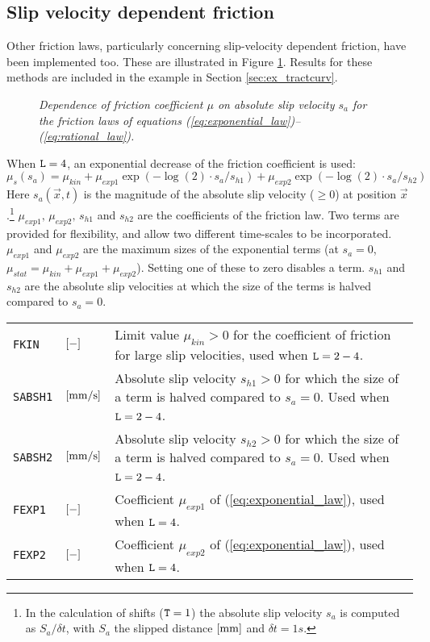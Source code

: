 \documentclass[12pt]{report}
\newcommand{\allexamp}[1]{}
\newenvironment{inputvars}{\vspace{0.4\baselineskip}%

\begin{tabular}{>{\raggedright}p{22mm}p{19mm}p{113mm}}}{
\end{tabular}

}
\newcommand{\inpvar}[3]{{\small\tt #1} & $#2$ & #3 \\[1ex]}
\begin{document}
\subsection{Slip velocity dependent friction}
\label{sec:veldep_fric}

Other friction laws, particularly concerning slip-velocity dependent
friction, have been implemented too. These are illustrated in Figure
\ref{fig:fric_laws}. Results for these methods are included in the
example in Section \ref{sec:ex_tractcurv}\allexamp{, whereas a detailed
investigation is shown in Section \ref{sec:ex_veldep}}.

\begin{figure}[bt]
\centering
{}
\caption{\em Dependence of friction coefficient $\mu$ on absolute slip
velocity $s_a$ for the friction laws of equations
(\ref{eq:exponential_law})--(\ref{eq:rational_law}).}
\label{fig:fric_laws}
\end{figure}

When ${\tt L}=4$, an exponential decrease of the friction coefficient
is used:
\begin{equation}\label{eq:exponential_law}
   \mu_s(s_a) = \mu_{kin} +
        \mu_{exp1} \exp(-\log(2)\cdot s_a/s_{h1}) +
        \mu_{exp2} \exp(-\log(2)\cdot s_a/s_{h2})
\end{equation}
Here $s_a(\vec{x},t)$ is the magnitude of the absolute slip velocity ($\ge 0$)
at position $\vec{x}$.\footnote{\label{foot:s_a}In the calculation of shifts
(${\tt T}=1$) the absolute slip velocity $s_a$ is computed as $S_a/\delta t$,
with $S_a$ the slipped distance $[\mathrm{mm}]$ and $\delta t=1\unit{s}$.}
$\mu_{exp1}, \,\mu_{exp2}, \,s_{h1}$ and $s_{h2}$ are the coefficients of
the friction law. Two terms are provided for flexibility, and allow two
different time-scales to be incorporated. $\mu_{exp1}$ and $\mu_{exp2}$ are
the maximum sizes of the exponential terms (at $s_a=0$, $\mu_{stat}=\mu_{kin}+
\mu_{exp1}+\mu_{exp2}$). Setting one of these to zero disables a term.
$s_{h1}$ and $s_{h2}$ are the absolute slip velocities at which the size of
the terms is halved compared to $s_a=0$.
\begin{inputvars}
\inpvar{FKIN}{\bunit{-}}{Limit value $\mu_{kin}>0$ for the coefficient of
        friction for large slip velocities, used when ${\tt L}=2-4$.}
\inpvar{SABSH1}{\bunit{mm/s}}{Absolute slip velocity $s_{h1}>0$ for which
        the size of a term is halved compared to $s_a=0$. Used when
        ${\tt L}=2-4$.}
\inpvar{SABSH2}{\bunit{mm/s}}{Absolute slip velocity $s_{h2}>0$ for which
        the size of a term is halved compared to $s_a=0$. Used when
        ${\tt L}=2-4$.}
\inpvar{FEXP1}{\bunit{-}}{Coefficient $\mu_{exp1}$ of
        (\ref{eq:exponential_law}), used when ${\tt L}=4$.}
\inpvar{FEXP2}{\bunit{-}}{Coefficient $\mu_{exp2}$ of
        (\ref{eq:exponential_law}), used when ${\tt L}=4$.}
\end{inputvars}
\end{document}

